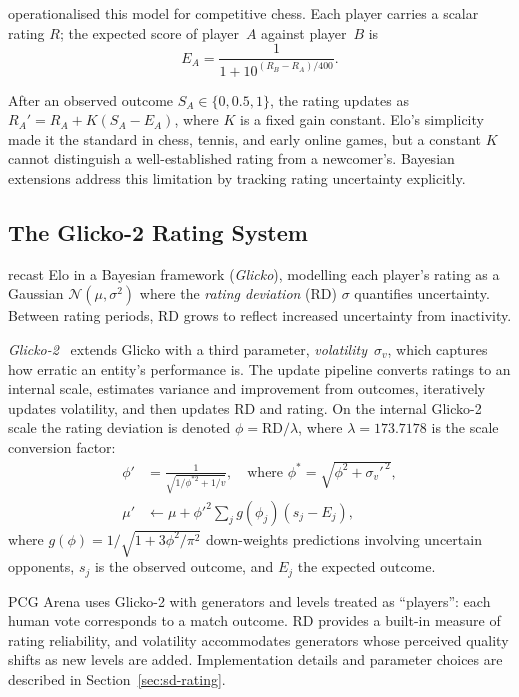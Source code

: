 \documentclass[shortabstract, mgr, english]{iithesis}
\begin{document}
\citet{elo1978rating} operationalised this model for competitive chess. Each
player carries a scalar rating $R$; the expected score of player~$A$ against
player~$B$ is
%
\begin{equation}
\label{eq:elo}
E_A = \frac{1}{1 + 10^{(R_B - R_A)/400}}.
\end{equation}

After an observed outcome $S_A \in \{0, 0.5, 1\}$, the rating updates as
$R_A' = R_A + K(S_A - E_A)$, where $K$ is a fixed gain constant. Elo's
simplicity made it the standard in chess, tennis, and early online games, but a
constant $K$ cannot distinguish a well-established rating from a newcomer's. Bayesian extensions address this limitation by tracking rating uncertainty explicitly.

\subsection{The Glicko-2 Rating System}
\label{subsec:bg-glicko2}

\citet{glickman1999parameter} recast Elo in a Bayesian framework
(\emph{Glicko}), modelling each player's rating as a Gaussian
$\mathcal{N}(\mu, \sigma^2)$ where the \emph{rating deviation} (RD)
$\sigma$ quantifies uncertainty. Between rating periods, RD grows to reflect
increased uncertainty from inactivity.

\emph{Glicko-2}~\citep{glickman2012glicko2} extends Glicko with a third
parameter, \emph{volatility}~$\sigma_v$, which captures how erratic an entity's
performance is. The update pipeline converts ratings to an internal scale,
estimates variance and improvement from outcomes, iteratively updates volatility,
and then updates RD and rating. On the internal Glicko-2 scale the rating
deviation is denoted $\phi = \text{RD} / \lambda$, where
$\lambda = 173.7178$ is the scale conversion factor:
%
\begin{align}
\phi' &= \frac{1}{\sqrt{1/\phi^{*2} + 1/v}}, \quad
  \text{where } \phi^* = \sqrt{\phi^2 + \sigma_v'^{\,2}},
  \label{eq:glicko-rd-bg} \\
\mu' &\leftarrow \mu + \phi'^2 \sum_j g(\phi_j)(s_j - E_j),
  \label{eq:glicko-mu-bg}
\end{align}
%
where $g(\phi) = 1/\sqrt{1 + 3\phi^2/\pi^2}$ down-weights predictions
involving uncertain opponents, $s_j$ is the observed outcome, and $E_j$ the
expected outcome.

PCG Arena uses Glicko-2 with generators and levels treated as ``players'': each
human vote corresponds to a match outcome. RD provides a built-in measure of
rating reliability, and volatility accommodates generators whose perceived
quality shifts as new levels are added. Implementation details and parameter
choices are described in Section~\ref{sec:sd-rating}.
\end{document}
